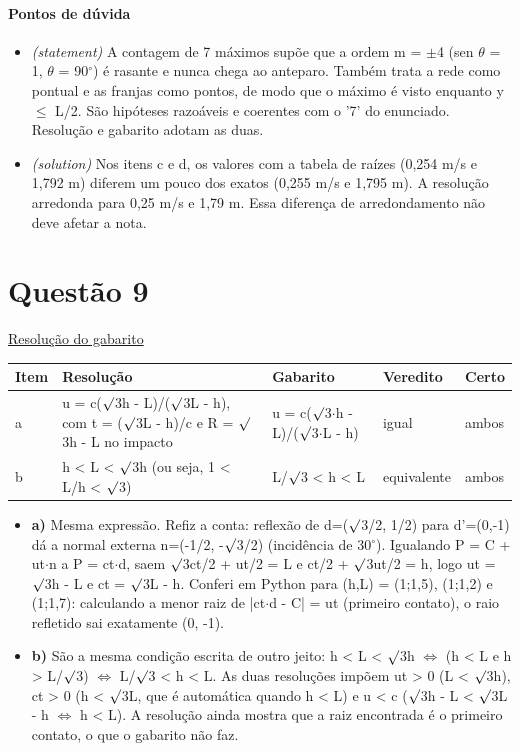 \documentclass{article}%
\begin{document}
\paragraph{Pontos de dúvida}%
\begin{itemize}%
\item%
\textit{(statement)} A contagem de 7 máximos supõe que a ordem m = $\pm$4 (sen $\theta$ = 1, $\theta$ = 90$^\circ$) é rasante e nunca chega ao anteparo. Também trata a rede como pontual e as franjas como pontos, de modo que o máximo é visto enquanto y $\leq$ L/2. São hipóteses razoáveis e coerentes com o '7' do enunciado. Resolução e gabarito adotam as duas.%
\item%
\textit{(solution)} Nos itens c e d, os valores com a tabela de raízes (0,254 m/s e 1,792 m) diferem um pouco dos exatos (0,255 m/s e 1,795 m). A resolução arredonda para 0,25 m/s e 1,79 m. Essa diferença de arredondamento não deve afetar a nota.%
\end{itemize}%
\section*{Questão 9}%
\href{https://poliedroresolve.sistemapoliedro.com.br/vestibulares/ime/2027/ime-2-fase-dia-2-27-10-2026-2-fase-dia-2/dissertativa-9-fisica-2-fase-dia-2-ime-2027}{Resolução do gabarito}\par\smallskip%
\begin{longtable}{@{}p{} p{} p{} p{} p{}@{}}\toprule Item & Resolução & Gabarito & Veredito & Certo \\ \midrule
a & u = c($\surd$3h - L)/($\surd$3L - h), com t = ($\surd$3L - h)/c e R = $\surd$3h - L no impacto & u = c($\surd$3$\cdot$h - L)/($\surd$3$\cdot$L - h) & igual & ambos \\
b & h < L < $\surd$3h (ou seja, 1 < L/h < $\surd$3) & L/$\surd$3 < h < L & equivalente & ambos \\
\bottomrule\end{longtable}%
\begin{itemize}%
\item%
\textbf{a)} Mesma expressão. Refiz a conta: reflexão de d=($\surd$3/2, 1/2) para d'=(0,-1) dá a normal externa n=(-1/2, -$\surd$3/2) (incidência de 30$^\circ$). Igualando P = C + ut$\cdot$n a P = ct$\cdot$d, saem $\surd$3ct/2 + ut/2 = L e ct/2 + $\surd$3ut/2 = h, logo ut = $\surd$3h - L e ct = $\surd$3L - h. Conferi em Python para (h,L) = (1;1,5), (1;1,2) e (1;1,7): calculando a menor raiz de |ct$\cdot$d - C| = ut (primeiro contato), o raio refletido sai exatamente (0, -1).%
\item%
\textbf{b)} São a mesma condição escrita de outro jeito: h < L < $\surd$3h $\Leftrightarrow$ (h < L e h > L/$\surd$3) $\Leftrightarrow$ L/$\surd$3 < h < L. As duas resoluções impõem ut > 0 (L < $\surd$3h), ct > 0 (h < $\surd$3L, que é automática quando h < L) e u < c ($\surd$3h - L < $\surd$3L - h $\Leftrightarrow$ h < L). A resolução ainda mostra que a raiz encontrada é o primeiro contato, o que o gabarito não faz.%
\end{itemize}%
\end{document}
